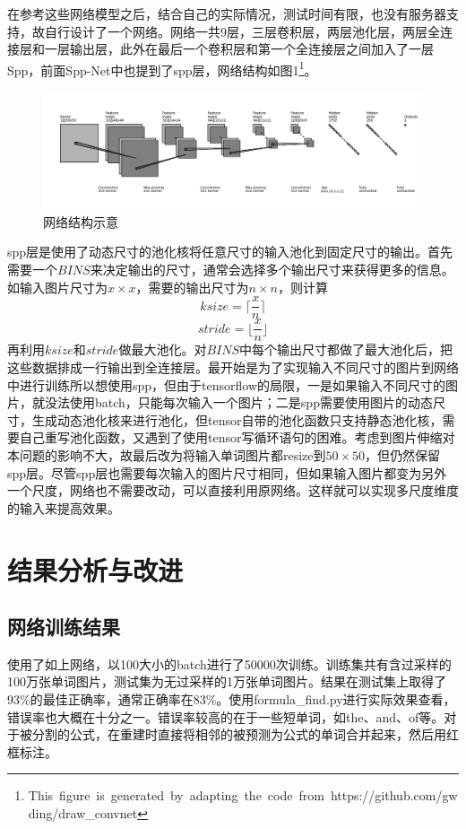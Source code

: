\documentclass[12pt]{article}
\begin{document}
在参考这些网络模型之后，结合自己的实际情况，测试时间有限，也没有服务器支持，故自行设计了一个网络。网络一共9层，三层卷积层，两层池化层，两层全连接层和一层输出层，此外在最后一个卷积层和第一个全连接层之间加入了一层Spp，前面Spp-Net中也提到了spp层，网络结构如图1\footnote{\hbox{This figure is generated by adapting the code from https://github.com/gwding/draw\_convnet}}。
\begin{figure}[hp]
    \centering
    \includegraphics[scale=0.4]{mynet.png}
    \caption{网络结构示意}
    \label{fig:label}
\end{figure}
spp层是使用了动态尺寸的池化核将任意尺寸的输入池化到固定尺寸的输出。首先需要一个$BINS$来决定输出的尺寸，通常会选择多个输出尺寸来获得更多的信息。如输入图片尺寸为$x \times x$，需要的输出尺寸为$n \times n$，则计算
$$ksize = \lceil \frac x n \rceil$$
$$stride = \lfloor \frac x n \rfloor$$
再利用$ksize$和$stride$做最大池化。对$BINS$中每个输出尺寸都做了最大池化后，把这些数据排成一行输出到全连接层。\cite{spp}最开始是为了实现输入不同尺寸的图片到网络中进行训练所以想使用spp，但由于tensorflow的局限，一是如果输入不同尺寸的图片，就没法使用batch，只能每次输入一个图片；二是spp需要使用图片的动态尺寸，生成动态池化核来进行池化，但tensor自带的池化函数只支持静态池化核，需要自己重写池化函数，又遇到了使用tensor写循环语句的困难。考虑到图片伸缩对本问题的影响不大，故最后改为将输入单词图片都resize到$50 \times 50$，但仍然保留spp层。尽管spp层也需要每次输入的图片尺寸相同，但如果输入图片都变为另外一个尺度，网络也不需要改动，可以直接利用原网络。这样就可以实现多尺度维度的输入来提高效果。

\section{结果分析与改进}

\subsection{网络训练结果}
\noindent

使用了如上网络，以100大小的batch进行了50000次训练。训练集共有含过采样的100万张单词图片，测试集为无过采样的1万张单词图片。结果在测试集上取得了93\%的最佳正确率，通常正确率在83\%。使用formula\_find.py进行实际效果查看，错误率也大概在十分之一。错误率较高的在于一些短单词，如the、and、of等。对于被分割的公式，在重建时直接将相邻的被预测为公式的单词合并起来，然后用红框标注。
\end{document}
